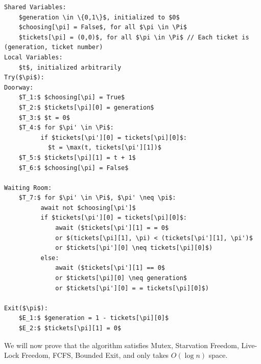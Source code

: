 \documentclass[12pt]{article}
\begin{document}
\begin{solution}
    \bbni    
\begin{lstlisting}[mathescape]
Shared Variables:
    $generation \in \{0,1\}$, initialized to $0$
    $choosing[\pi] = False$, for all $\pi \in \Pi$
    $tickets[\pi] = (0,0)$, for all $\pi \in \Pi$ // Each ticket is (generation, ticket number)
Local Variables:
    $t$, initialized arbitrarily
Try($\pi$):
Doorway:
    $T_1:$ $choosing[\pi] = True$
    $T_2:$ $tickets[\pi][0] = generation$
    $T_3:$ $t = 0$
    $T_4:$ for $\pi' \in \Pi$:
          if $tickets[\pi'][0] = tickets[\pi][0]$: 
            $t = \max(t, tickets[\pi'][1])$
    $T_5:$ $tickets[\pi][1] = t + 1$
    $T_6:$ $choosing[\pi] = False$

Waiting Room:
    $T_7:$ for $\pi' \in \Pi$, $\pi' \neq \pi$:
          await not $choosing[\pi']$
          if $tickets[\pi'][0] = tickets[\pi][0]$:
              await ($tickets[\pi'][1] = = 0$ 
              or $(tickets[\pi][1], \pi) < (tickets[\pi'][1], \pi')$ 
              or $tickets[\pi'][0] \neq tickets[\pi][0]$)
          else:
              await ($tickets[\pi'][1] == 0$
              or $tickets[\pi][0] \neq generation$
              or $tickets[\pi'][0] = = tickets[\pi][0]$)

Exit($\pi$):
    $E_1:$ $generation = 1 - tickets[\pi][0]$
    $E_2:$ $tickets[\pi][1] = 0$
\end{lstlisting}

We will now prove that the algorithm satisfies Mutex, Starvation Freedom, Live-Lock Freedom, FCFS, Bounded Exit, and only takes $O(\log n)$ space. 


\end{solution}
\end{document}

